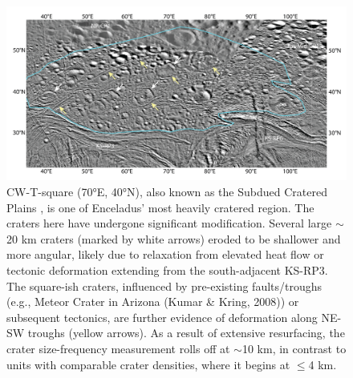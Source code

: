 \documentclass[preprint,11pt,3p,times,authoryear]{elsarticle}
\begin{document}
{\begin{figure}[H]
    \includegraphics[width=1.0\linewidth]{fig/FigS4B_CW-T-square.png}
    \caption{CW-T-square (70°E, 40°N), also known as the Subdued Cratered Plains \citep{CrowWillard2015}, is one of Enceladus' most heavily cratered region. The craters here have undergone significant modification. Several large $\sim$20 km craters (marked by white arrows) eroded to be shallower and more angular, likely due to relaxation from elevated heat flow \citep{Bland2012} or tectonic deformation extending from the south-adjacent KS-RP3. The square-ish craters, influenced by pre-existing faults/troughs (e.g., Meteor Crater in Arizona (Kumar \& Kring, 2008)) or subsequent tectonics, are further evidence of deformation along NE-SW troughs (yellow arrows). As a result of extensive resurfacing, the crater size-frequency measurement rolls off at $\sim$10 km, in contrast to units with comparable crater densities, where it begins at $\le$4 km.}
    \label{fig:app_erosion1}
\end{figure}


}
\end{document}
